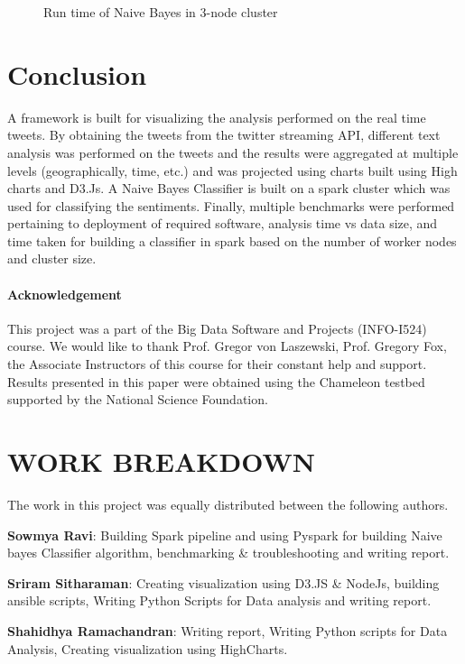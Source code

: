 \documentclass[9pt,twocolumn,twoside]{../../styles/osajnl}
\begin{document}
\begin{figure}[htbp]
\centering
{}
\caption{Run time of Naive Bayes in 3-node cluster}
\label{fig:chamstat3}
\end{figure}


\section{Conclusion}
A framework is  built for visualizing the analysis performed on the real time tweets. By obtaining the tweets from the twitter streaming API, different text analysis was performed on the tweets and the results were aggregated at multiple levels (geographically, time, etc.) and was projected using charts built using High charts and D3.Js. A Naive Bayes Classifier is built on a spark cluster which was used for classifying the sentiments. Finally, multiple benchmarks were performed pertaining to deployment of required software, analysis time vs data size, and time taken for building a classifier in spark based on the number of worker nodes and cluster size.

\paragraph{Acknowledgement}

This project was a part of the Big Data Software and Projects (INFO-I524) course. We would
like to thank Prof. Gregor von Laszewski, Prof. Gregory Fox, the
Associate Instructors of this course for their constant help and support. Results presented in
this paper were obtained using the Chameleon testbed supported by the
National Science Foundation.



\section{WORK BREAKDOWN}
	The work in this project was equally distributed between the following authors.
	
	\textbf{Sowmya Ravi}: Building Spark pipeline and using Pyspark for building Naive bayes Classifier algorithm, benchmarking \& troubleshooting and writing report.
	
	\textbf{Sriram Sitharaman}: Creating visualization using D3.JS \& NodeJs, building ansible scripts, Writing Python Scripts for Data analysis and writing report.
	
	\textbf{Shahidhya Ramachandran}: Writing report, Writing Python scripts for Data Analysis, Creating visualization using HighCharts. 
	
\end{document}
